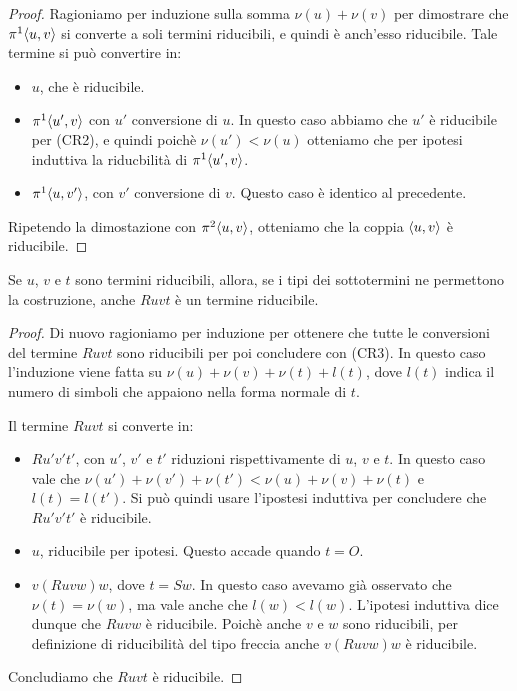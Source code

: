 \documentclass[]{marticle}
\begin{document}
\begin{proof}
    Ragioniamo per induzione sulla somma $\nu(u)+\nu(v)$ per dimostrare che
    $\pi^1\langle u,v \rangle$ si converte a soli termini riducibili, e quindi \`e
    anch'esso riducibile. Tale termine si pu\`o convertire in:
    \begin{itemize}
        \item $u$, che \`e riducibile.
        \item $\pi^1\langle u',v \rangle$ con $u'$ conversione di $u$. In questo caso
            abbiamo che $u'$ \`e riducibile per (CR2), e quindi poich\`e
            $\nu(u')<\nu(u)$ otteniamo che per ipotesi induttiva la
            riducbilit\`a di $\pi^1\langle u',v \rangle$.
        \item $\pi^1\langle u,v' \rangle$, con $v'$ conversione di $v$. Questo caso \`e
            identico al precedente.
    \end{itemize}
    Ripetendo la dimostazione con $\pi^2\langle u,v \rangle$, otteniamo che la coppia
    $\langle u,v \rangle$ \`e riducibile.
\end{proof}

\begin{block}[Lemma]
    Se $u$, $v$ e $t$ sono termini riducibili, allora, se i tipi dei
    sottotermini ne permettono la costruzione, anche $Ruvt$ \`e un termine
    riducibile.
\end{block}

\begin{proof}
    Di nuovo ragioniamo per induzione per ottenere che tutte le conversioni del
    termine $Ruvt$ sono riducibili per poi concludere con (CR3). In questo caso
    l'induzione viene fatta su $\nu(u) + \nu(v) + \nu(t) + l(t)$, dove $l(t)$
    indica il numero di simboli che appaiono nella forma normale di $t$.

    Il termine $Ruvt$ si converte in:
    \begin{itemize}
        \item $Ru'v't'$, con $u'$, $v'$ e $t'$ riduzioni rispettivamente di $u$,
            $v$ e $t$. In questo caso vale che $\nu(u') + \nu(v') + \nu(t')
            < \nu(u) + \nu(v) + \nu(t)$ e $l(t)=l(t')$. Si pu\`o quindi usare
            l'ipostesi induttiva per concludere che $R u'v't'$ \`e riducibile.
        \item $u$, riducibile per ipotesi. Questo accade quando $t=O$. 
        \item $v(Ruvw)w$, dove $t=Sw$. In questo caso avevamo gi\`a osservato
            che $\nu(t) = \nu(w)$, ma vale anche che $l(w) < l(w)$. L'ipotesi
            induttiva dice dunque che $Ruvw$ \`e riducibile. Poich\`e anche $v$
            e $w$ sono riducibili, per definizione di riducibilit\`a del tipo
            freccia anche $v(Ruvw)w$ \`e riducibile.
    \end{itemize}
    Concludiamo che $Ruvt$ \`e riducibile.
\end{proof}
\end{document}
